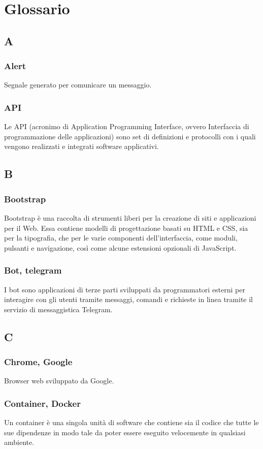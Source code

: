 \appendix
{}

\section{Glossario}
\subsection{A}
\subsubsection*{Alert} Segnale generato per comunicare un messaggio.
\subsubsection*{API} Le API (acronimo di Application Programming Interface, ovvero Interfaccia di programmazione delle applicazioni) sono set di definizioni e protocolli con i quali vengono realizzati e integrati software applicativi.
\subsection{B}
\subsubsection*{Bootstrap}  Bootstrap è una raccolta di strumenti liberi per la creazione di siti e applicazioni per il Web. Essa contiene modelli di progettazione basati su HTML e CSS, sia per la tipografia, che per le varie componenti dell'interfaccia, come moduli, pulsanti e navigazione, così come alcune estensioni opzionali di JavaScript.
\subsubsection*{Bot, telegram}  I bot sono applicazioni di terze parti sviluppati da programmatori esterni per interagire con gli utenti tramite messaggi, comandi e richieste in linea tramite il servizio di messaggistica Telegram.
\subsection{C}
\subsubsection*{Chrome, Google}
Browser web sviluppato da Google.
\subsubsection*{Container, Docker}
Un container è una singola unità di software che contiene sia il codice che tutte le sue dipendenze in modo tale da poter essere eseguito velocemente in qualsiasi ambiente.
